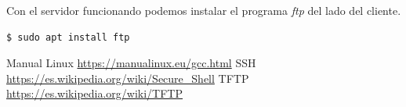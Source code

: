 \documentclass[12pt]{article}
\begin{document}
Con el servidor funcionando podemos instalar el programa \emph{ftp} del lado del cliente.

\begin{lstlisting}[frame=single]
$ sudo apt install ftp
\end{lstlisting}



\newpage
\begin{thebibliography}{99}
 Manual Linux \url{https://manualinux.eu/gcc.html}
 SSH \url{https://es.wikipedia.org/wiki/Secure_Shell}
 TFTP \url{https://es.wikipedia.org/wiki/TFTP}
\end{thebibliography}
\end{document}
